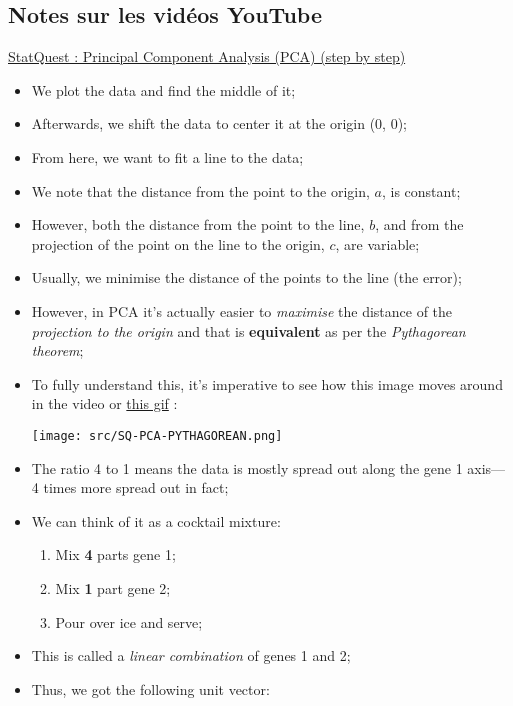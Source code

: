 \documentclass[12pt, titlepage, french]{report}
\begin{document}
\subsection{Notes sur les vidéos YouTube}

\begin{YTB_SUMM}{\href{https://www.youtube.com/watch?v=FgakZw6K1QQ}{StatQuest : Principal Component Analysis (PCA) (step by step)}}
\begin{itemize}
	\item	We plot the data and find the middle of it;
	\item	Afterwards, we shift the data to center it at the origin ($0$, $0$);
	\item	From here, we want to fit a line to the data;
	\item[]	We note that the distance from the point to the origin, $a$, is constant;
	\item[]	However, both the distance from the point to the line, $b$, and from the projection of the point on the line to the origin, $c$, are variable;
	\item	Usually, we minimise the distance of the points to the line (the error);
	\item[]	However, in PCA it's actually easier to \textit{maximise} the distance of the \textit{projection to the origin} and that is \textbf{equivalent} as per the \textit{Pythagorean theorem};
	\item	To fully understand this, it's imperative to see how this image moves around in the video or \href{https://cdn-images-1.medium.com/max/800/0*XqrkXQoEQEIRe0Nm}{this gif}	:	
	
	\texttt{[image: src/SQ-PCA-PYTHAGOREAN.png]}
	\item	The ratio 4 to 1 means the data is mostly spread out along the gene 1 axis---4 times more spread out in fact;
	\item[]	We can think of it as a cocktail mixture:
		\begin{enumerate}
		\item	Mix \textbf{4} parts gene 1;
		\item	Mix \textbf{1} part gene 2;
		\item	Pour over ice and serve;
		\end{enumerate}
	\item[]	This is called a \textit{linear combination} of genes 1 and 2;
	\item	Thus, we got the following unit vector:
	

\end{itemize}
\end{YTB_SUMM}
\end{document}
